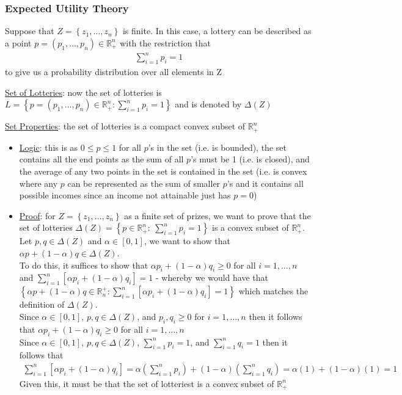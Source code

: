 \documentclass{article}
\begin{document}
\subsubsection{Expected Utility Theory}
Suppose that $Z = \left\{ z_{1}, \dots, z_{n} \right\}$ is finite. In this case, a lottery can be described as a point $p = (p_{1}, \dots, p_{n}) \in \mathbb{R}_{+}^{n}$ with the restriction that
\begin{gather*}
  \sum_{i=1}^{n}p_{i} = 1
\end{gather*}
to give us a probability distribution over all elements in Z
\par \vspace{0.3em}
  \underline{Set of Lotteries}: now the set of lotteries is $L = \left\{ p = (p_{1}, \dots, p_{n}) \in \mathbb{R}_{+}^{n}: \sum_{i=1}^{n} p_{i}=1 \right\}$ and is denoted by $\Delta (Z)$
  \par
  \underline{Set Properties}: the set of lotteries is a compact convex subset of $\mathbb{R}_{+}^{n}$
  \begin{itemize}
    \item \underline{Logic}: this is as $0 \leq p \leq 1$ for all $p$'s in the set (i.e. is bounded), the set contains all the end points as the sum of all $p$'s must be 1 (i.e. is closed), and the average of any two points in the set is contained in the set (i.e. is convex where any $p$ can be represented as the sum of smaller $p$'s and it contains all possible incomes since an income not attainable just has $p=0$)
    \item  \underline{Proof}: for $Z = \left\{ z_{1}, \dots, z_{n} \right\}$ as a finite set of prizes, we want to prove that the set of lotteries $\Delta (Z) = \left\{ p \in \mathbb{R}_{+}^{n}: \ \sum_{i=1}^{n} p_{i} = 1 \right\}$ is a convex subset of $\mathbb{R}_{+}^{n}$. Let $p,q \in \Delta (Z)$ and $\alpha \in [0,1]$, we want to show that $\alpha p + (1- \alpha)q \in \Delta(Z)$. \\
    To do this, it suffices to show that $\alpha p_{i} + (1-\alpha) q_{i} \geq 0$ for all $i = 1, \dots, n$ and $\sum_{i=1}^{n} [\alpha p_{i} + (1-\alpha)q_{i}] = 1$ - whereby we would have that $\left\{ \alpha p + (1-\alpha)q \in \mathbb{R}_{n}^{+}: \sum_{i=1}^{n}[\alpha p_{i} + (1- \alpha)q_{i} ] = 1 \right\}$ which matches the definition of $\Delta(Z)$. \\
    Since $\alpha \in [0,1]$, $p, q \in \Delta(Z)$, and $p_{i},q_{i} \geq 0$ for $i = 1, \dots, n$ then it follows that $\alpha p_{i} + (1-\alpha) q_{i} \geq 0$ for all $i = 1, \dots, n$ \\
    Since $\alpha \in [0,1]$, $p, q \in \Delta(Z)$, $\sum_{i=1}^{n} p_{i} = 1$, and $\sum_{i=1}^{n}q_{i} = 1$ then it follows that
    \begin{gather*}
      \sum_{i=1}^{n} [\alpha p_{i} + (1-\alpha)q_{i}] = \alpha (\sum_{i=1}^{n} p_{i}) + (1-\alpha)(\sum_{i=1}^{n} q_{i}) = \alpha (1) + (1- \alpha)(1) = 1
    \end{gather*}
    Given this, it must be that the set of lotteriest is a convex subset of $\mathbb{R}_{+}^{n}$
  \end{itemize}
  \par
\vspace{6mm}
\end{document}
